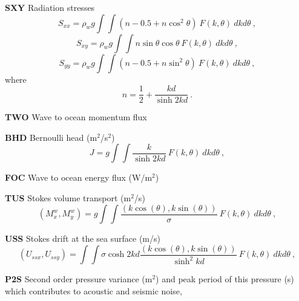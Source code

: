 \begin{list}{)\hfill}
\begin{list}{)\hfill}
            { \leftmargin 8mm 
             \rightmargin 0mm \itemsep 0mm \parsep 0mm}
\item \textbf{SXY} Radiation stresses
      \begin{equation} S_{xx} = \rho_w g \int \!\!\!\! \int \left
        ( n - 0.5 + n \cos^2 \theta \right )  \: F(k,\theta) \: dk d\theta
      \: , \label{eq:Sxx} \end{equation}
      \begin{equation} S_{xy} =\rho_w g \int \!\!\!\! \int
        n \sin \theta \cos \theta  \: F(k,\theta) \: dk d\theta
      \: , \label{eq:Syy} \end{equation}
      \begin{equation} S_{yy} =\rho_w g \int \!\!\!\! \int \left
        ( n - 0.5 + n \sin^2 \theta \right )  \: F(k,\theta) \: dk d\theta
      \: , \label{eq:Sxy} \end{equation}
      where
      \begin{equation} n = \frac{1}{2} + \frac{kd}{\sinh 2kd}
      \: . \label{eq:n} \end{equation}
\item \textbf{TWO} Wave to ocean momentum flux
\item \textbf{BHD} Bernoulli head (m$^2$/s$^2$)
      \begin{equation} J =  g \int \!\!\!\! \int  \frac{k}
        {\sinh 2kd}  \: F(k,\theta) \: dk d\theta
      \: , \label{eq:BHD} \end{equation}
\item \textbf{FOC} Wave to ocean energy flux (W/m$^2$)
\item \textbf{TUS} Stokes volume transport (m$^2$/s)
     \begin{equation} (M^w_x,M^w_y) =  g \int \!\!\!\! \int  \frac{(k \cos(\theta),k \sin(\theta))}
        {\sigma}  \: F(k,\theta) \: dk d\theta
      \: , \label{eq:Mw} \end{equation}
\item \textbf{USS} Stokes drift at the sea surface (m/s)
     \begin{equation} (U_{ssx},U_{ssy}) =  \int \!\!\!\! \int  \sigma \cosh 2kd \frac{(k \cos(\theta),k \sin(\theta))}
        {\sinh^2 kd}  \: F(k,\theta) \: dk d\theta
      \: , \label{eq:Uss} \end{equation}
\item \textbf{P2S} Second order pressure variance (m$^2$) and peak period of this pressure (s) which contributes to acoustic and seismic noise, 

\end{list}
\end{list}
